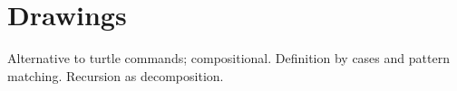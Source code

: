 
\section{Drawings}
Alternative to turtle commands; compositional. Definition by cases and pattern matching. Recursion as decomposition.
